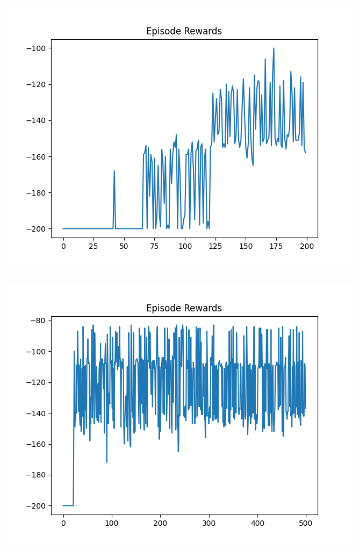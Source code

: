 \begin{figure}[H]
    \centering
    \begin{subfigure}{.47\linewidth}
        \centering
        \includegraphics[width=\textwidth]{mountain/2024-06-15_13-48-51_dqn_mountaincar_episode_rewards.png}
    \end{subfigure}
    \begin{subfigure}{.47\linewidth}
        \centering
        \includegraphics[width=\textwidth]{mountain/2024-06-15_13-02-52_dqn_mountaincar_episode_rewards.png}
    \end{subfigure}
    \begin{subfigure}{.47\linewidth}
        \centering

\end{subfigure}
\end{figure}
